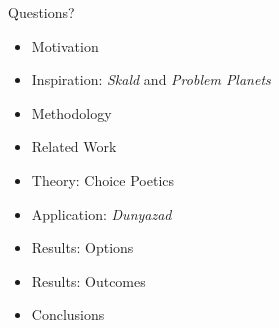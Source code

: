 \documentclass[xcolor=x11names]{beamer}
\def\dunyazad/{\textit{Dunyazad}}
\def\skald/{\textit{Skald}}
\def\problemplanets/{\textit{Problem Planets}}
\begin{document}
\begin{frame}{Questions?}
  \begin{itemize}
    \item Motivation
    \item Inspiration: \skald/ and \problemplanets/
    \item Methodology
    \item Related Work
    \item Theory: Choice Poetics
    \item Application: \dunyazad/
    \item Results: Options
    \item Results: Outcomes
    \item Conclusions
  \end{itemize}
\end{frame}
\end{document}
